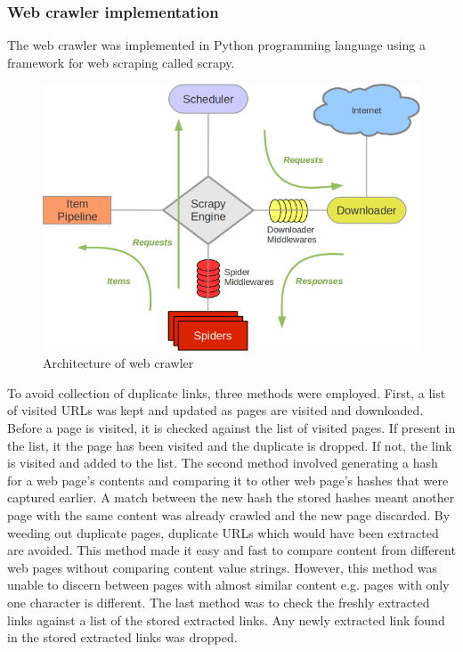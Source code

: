 \subsubsection{Web crawler implementation}
The web crawler was implemented in Python programming language using a framework for web scraping called scrapy.
\begin{figure}[H]
	\includegraphics[width=\linewidth,scale=0.5]{../static/img/scrapy.png}
	\caption{Architecture of web crawler}
\end{figure}


\noindent
To avoid collection of duplicate links, three methods were employed. First, a list of visited URLs was kept and updated as pages are visited and downloaded. Before a page is visited, it is checked against the list of visited pages. If present in the list, it the page has been visited and the duplicate is dropped. If not, the link is visited and added to the list. The second method involved generating a hash for a web page's contents and comparing it to other web page's hashes that were captured earlier. A match between the new hash the stored hashes meant another page with the same content was already crawled and the new page discarded. By weeding out duplicate pages, duplicate URLs which would have been extracted are avoided. This method made it easy and fast to compare content from different web pages without comparing content value strings. However, this method was unable to discern between pages with almost similar content e.g. pages with only one character is different. The last method was to check the freshly extracted links against a list of the stored extracted links. Any newly extracted link found in the stored extracted links was dropped.

